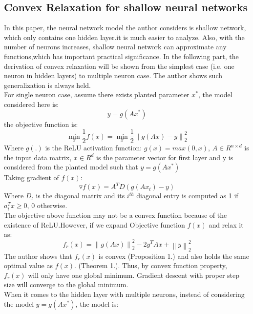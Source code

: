 \documentclass{article}
\begin{document}
\subsection{Convex Relaxation for shallow neural networks }
In this paper, the neural network model the author considers is shallow network, which only contains one hidden layer.it is much easier to analyze. Also, with the number of neurons increases, shallow neural network can approximate any functions,which has important practical significance. In the following part, the derivation of convex relaxation will be shown from the simplest case (i.e. one neuron in hidden layers) to multiple neuron case. The author shows such generalization is always held. \\
For single neuron case, assume there exists planted parameter $x^*$, the model considered here is:
\begin{equation}
    y=g(Ax^*)
\end{equation}
the objective function is:
\begin{equation}
    \min_{x}\frac{1}{2}f(x)=\min_{x}\frac{1}{2}\left \| g(Ax)-y \right \|_2^2
\end{equation}
Where $g(.)$ is the ReLU activation function: $g(x)=max(0,x)$, $A\in R^{n\times d}$ is the input data matrix, $x\in R^d$ is the parameter vector for first layer and y is considered from the planted model such that $y=g(Ax^*)$\\
Taking gradient of $f(x)$:
\begin{equation}
    \triangledown f(x)=A^TD(g(Ax_t)-y)
\end{equation}
Where $D_t$ is the diagonal matrix and its $i^{th}$ diagonal entry is computed as 1 if $a_i^T x\geq 0$, 0 otherwise. \\
The objective above function may not be a convex function because of the existence of ReLU.However, if we expand Objective function $f(x)$ and relax it as:
\begin{equation}
    f_r(x)=\left \| g(Ax) \right \|_2^2-2y^TAx+\left \| y \right \|_2^2
\end{equation}
The author shows that $f_r(x)$ is convex (Proposition 1.) and also holds the same optimal value as $f(x)$. (Theorem 1.)\cite{cvxrelxation}. Thus, by convex function property, $f_r(x)$ will only have one global minimum. Gradient descent with proper step size will converge to the global minimum.\\
When it comes to the hidden layer with multiple neurons, instead of considering the model $y=g(Ax^*)$, the model is:
\end{document}
